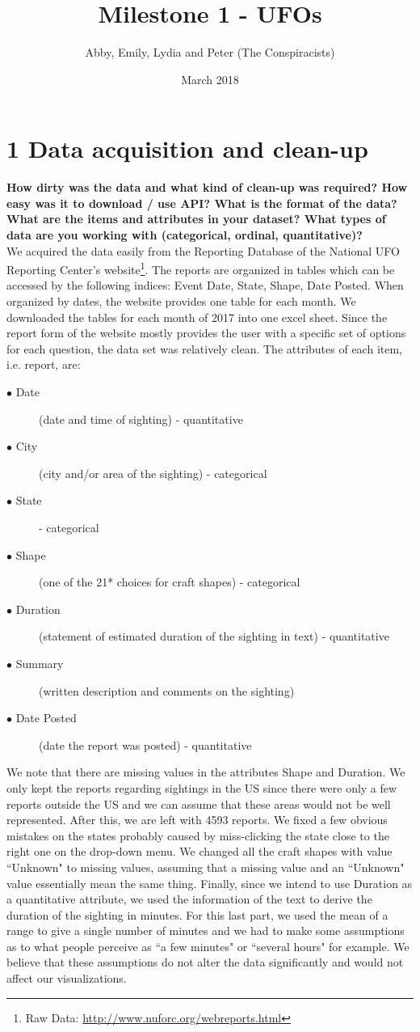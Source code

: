 \documentclass{neu_handout}
\title{Milestone 1 - UFOs}
\author{Abby, Emily, Lydia and Peter (The Conspiracists)}
\date{March 2018}
\begin{document}
\section*{1 Data acquisition and clean-up}

\textbf{How dirty was the data and what kind of clean-up was required? How
easy was it to download / use API? What is the format of the data? What are the
items and attributes in your dataset? What types of data are you working with
(categorical, ordinal, quantitative)?}\\

We acquired the data easily from the Reporting Database of the National UFO Reporting Center's website\footnote{Raw Data: \url{http://www.nuforc.org/webreports.html}}. The reports are organized in tables which can be accessed by the following indices: Event Date, State, Shape, Date Posted. When organized by dates, the website provides one table for each month. We downloaded the tables for each month of 2017 into one excel sheet. Since the report form of the website mostly provides the user with a specific set of options for each question, the data set was relatively clean. The attributes of each item, i.e. report, are:

\begin{description}
  \item[$\bullet$ Date] (date and time of sighting) - quantitative
  \item[$\bullet$ City] (city and/or area of the sighting) - categorical
  \item[$\bullet$ State] - categorical
  \item[$\bullet$ Shape] (one of the 21* choices for craft shapes) - categorical
  \item[$\bullet$ Duration] (statement of estimated duration of the sighting in text) - quantitative
  \item[$\bullet$ Summary] (written description and comments on the sighting)
  \item[$\bullet$ Date Posted] (date the report was posted) - quantitative
\end{description}

We note that there are missing values in the attributes Shape and Duration. We only kept the reports regarding sightings in the US since there were only a few reports outside the US and we can assume that these areas would not be well represented. After this, we are left with 4593 reports. We fixed a few obvious mistakes on the states probably caused by miss-clicking the state close to the right one on the drop-down menu. We changed all the craft shapes with value ``Unknown" to missing values, assuming that a missing value and an ``Unknown" value essentially mean the same thing. Finally, since we intend to use Duration as a quantitative attribute, we used the information of the text to derive the duration of the sighting in minutes. For this last part, we used the mean of a range to give a single number of minutes and we had to make some assumptions as to what people perceive as ``a few minutes" or ``several hours" for example. We believe that these assumptions do not alter the data significantly and would not affect our visualizations.
\end{document}
